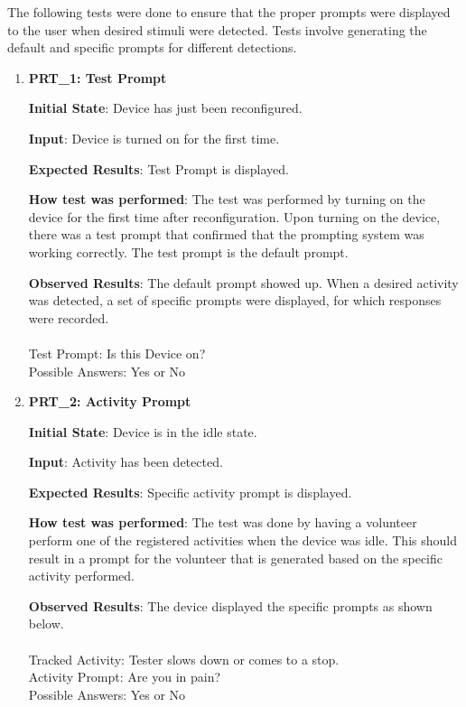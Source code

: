 \documentclass[12pt, titlepage]{article}
\begin{document}
The following tests were done to ensure that the proper prompts were displayed to the user when desired stimuli were detected. Tests involve generating the default and specific prompts for different detections.

\begin{enumerate}
  \item{\textbf{PRT\_1: Test Prompt} \\}\label{PRT1}

  \textbf{Initial State}: Device has just been reconfigured.

  \textbf{Input}: Device is turned on for the first time.

  \textbf{Expected Results}: Test Prompt is displayed.

  \textbf{How test was performed}: The test was performed by turning on the device for the first time after reconfiguration. Upon turning on the device, there was a test prompt that confirmed that the prompting system was working correctly. The test prompt is the default prompt.

  \textbf{Observed Results}: The default prompt showed up. When a desired activity was detected, a set of specific prompts were displayed, for which responses were recorded.\\\\
  Test Prompt: Is this Device on?\\
  Possible Answers: Yes or No
  \item{\textbf{PRT\_2: Activity Prompt} \\}\label{PRT2}

  \textbf{Initial State}: Device is in the idle state.

  \textbf{Input}: Activity has been detected.

  \textbf{Expected Results}: Specific activity prompt is displayed.

  \textbf{How test was performed}: The test was done by having a volunteer perform one of the registered activities when the device was idle. This should result in a prompt for the volunteer that is generated based on the specific activity performed.

  \textbf{Observed Results}: The device displayed the specific prompts as shown below.\\\\
  Tracked Activity: Tester slows down or comes to a stop.\\
  Activity Prompt: Are you in pain?\\
  Possible Answers: Yes or No

\end{enumerate}
\end{document}
